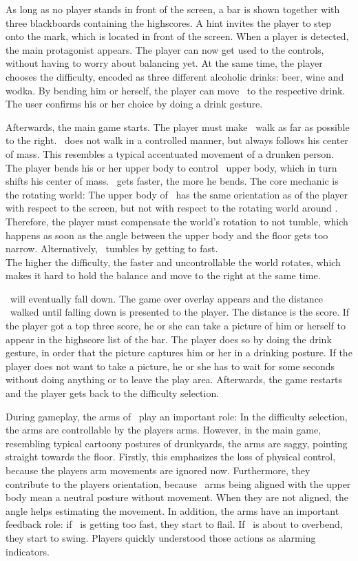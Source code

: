As long as no player stands in front of the screen, a bar is shown together with three blackboards containing the highscores. A hint invites the player to step onto the mark, which is located in front of the screen. When a player is detected, the main protagonist \ed appears. The player can now get used to the controls, without having to worry about balancing yet. At the same time, the player chooses the difficulty, encoded as three different alcoholic drinks: beer, wine and wodka. By bending him or herself, the player can move \ed\ to the respective drink. The user confirms his or her choice by doing a drink gesture.\lbreak

Afterwards, the main game starts. The player must make \ed\ walk as far as possible to the right. \ed\ does not walk in a controlled manner, but always follows his center of mass. This resembles a typical accentuated movement of a drunken person. The player bends his or her upper body to control \eds\ upper body, which in turn shifts his center of mass. \ed\ gets faster, the more he bends. The core mechanic is the rotating world: The upper body of \ed\ has the same orientation as of the player with respect to the screen, but not with respect to the rotating world around \ed. Therefore, the player must compensate the world's rotation to not tumble, which happens as soon as the angle between the upper body and the floor gets too narrow. Alternatively, \ed\ tumbles by getting to fast.\\
The higher the difficulty, the faster and uncontrollable the world rotates, which makes it hard to hold the balance and move to the right at the same time.\lbreak

\ed\ will eventually fall down. The game over overlay appears and the distance \ed\ walked until falling down is presented to the player. The distance is the score. If the player got a top three score, he or she can take a picture of him or herself to appear in the highscore list of the bar. The player does so by doing the drink gesture, in order that the picture captures him or her in a drinking posture. If the player does not want to take a picture, he or she has to wait for some seconds without doing anything or to leave the play area. Afterwards, the game restarts and the player gets back to the difficulty selection.\lbreak

During gameplay, the arms of \ed\ play an important role: In the difficulty selection, the arms are controllable by the players arms. However, in the main game, resembling typical cartoony postures of drunkyards, the arms are saggy, pointing straight towards the floor. Firstly, this emphasizes the loss of physical control, because the players arm movements are ignored now. Furthermore, they contribute to the players orientation, because \eds\ arms being aligned with the upper body mean a neutral posture without movement. When they are not aligned, the angle helps estimating the movement. In addition, the arms have an important feedback role: if \ed\ is getting too fast, they start to flail. If \ed\ is about to overbend, they start to swing. Players quickly understood those actions as alarming indicators.